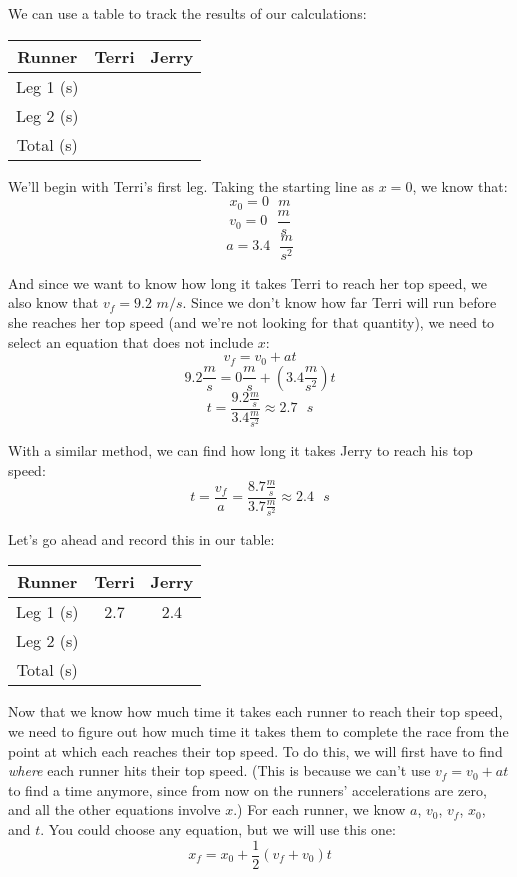 We can use a table to track the results of our calculations:
\begin{center}
\begin{tabular}{|c|c|c|}
\hline
Runner & Terri & Jerry\\\hline
Leg 1 (s) & & \\\hline
Leg 2 (s) & & \\\hline
Total (s) & & \\\hline
\end{tabular}
\end{center}

We'll begin with Terri's first leg. Taking the starting line as $x = 0$, we know 
that:
$$x_0 = 0\text{ }m$$
$$v_0 = 0\text { } \frac{m}{s}$$
$$a = 3.4\text{ }\frac{m}{s^2}$$

And since we want to know how long it takes Terri to reach her top speed, we 
also know that $v_f = 9.2$ $m/s$. Since we don't know how far Terri will run 
before she reaches her top speed (and we're not looking for that quantity), we 
need to select an equation that does not include $x$:
$$v_f = v_0 + at$$
$$9.2 \frac{m}{s} = 0 \frac{m}{s} + \left(3.4 \frac{m}{s^2} \right)t$$
$$t = \frac{9.2 \frac{m}{s}}{3.4 \frac{m}{s^2}} \approx 2.7\text{ }s$$

With a similar method, we can find how long it takes Jerry to reach his top 
speed:
$$t = \frac{v_f}{a} = \frac{8.7 \frac{m}{s}}{3.7 \frac{m}{s^2}} \approx 2.4
\text{ }s$$

Let's go ahead and record this in our table:
\begin{center}
\begin{tabular}{|c|c|c|}
\hline
Runner & Terri & Jerry\\\hline
Leg 1 (s) & 2.7 & 2.4 \\\hline
Leg 2 (s) & & \\\hline
Total (s) & & \\\hline
\end{tabular}
\end{center}

Now that we know how much time it takes each runner to reach their top speed, we 
need to figure out how much time it takes them to complete the race from the 
point at which each reaches their top speed. To do this, we will first have to 
find \textit{where} each runner hits their top speed. (This is because we can't 
use $v_f = v_0 + at$ to find a time anymore, since from now on the runners' 
accelerations are zero, and all the other equations involve $x$.) For each 
runner, we know $a$, $v_0$, $v_f$, $x_0$, and $t$. You could choose any equation, 
but we will use this one:
$$x_f = x_0 + \frac{1}{2} \left( v_f + v_0 \right)t$$

